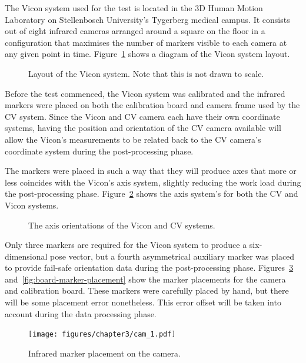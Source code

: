 The Vicon system used for the test is located in the 3D Human Motion Laboratory on Stellenbosch University's Tygerberg medical campus. It consists out of eight infrared cameras arranged around a square on the floor in a configuration that maximises the number of markers visible to each camera at any given point in time. Figure~\ref{fig:vicon-layout} shows a diagram of the Vicon system layout. 
 
\begin{figure}
  \centering
  \def\svgwidth{0.6\textwidth}
  
  \caption{Layout of the Vicon system. Note that this is not drawn to scale.}
\label{fig:vicon-layout}
\end{figure}

Before the test commenced, the Vicon system was calibrated and the infrared markers were placed on both the calibration board and camera frame used by the CV system. Since the Vicon and CV camera each have their own coordinate systems, having the position and orientation of the CV camera available will allow the Vicon's measurements to be related back to the CV camera's coordinate system during the post-processing phase. 

The markers were placed in such a way that they will produce axes that more or less coincides with the Vicon's axis system, slightly reducing the work load during the post-processing phase. Figure~\ref{fig:cam-vicon-axes} shows the axis system's for both the CV and Vicon systems.

\begin{figure}
  \centering
  \def\svgwidth{0.6\textwidth}
  
  \caption{The axis orientations of the Vicon and CV systems.}
\label{fig:cam-vicon-axes}
\end{figure}

Only three markers are required for the Vicon system to produce a six-dimensional pose vector, but a fourth asymmetrical auxiliary marker was placed to provide fail-safe orientation data during the post-processing phase. Figures~\ref{fig:cam-marker-placement} and~\ref{fig:board-marker-placement} show the marker placements for the camera and calibration board. These markers were carefully placed by hand, but there will be some placement error nonetheless. This error offset will be taken into account during the data processing phase. 

\begin{figure}
   \centering 
   \texttt{[image: figures/chapter3/cam\_1.pdf]}
   \caption{Infrared marker placement on the camera.}
\label{fig:cam-marker-placement}
\end{figure}

